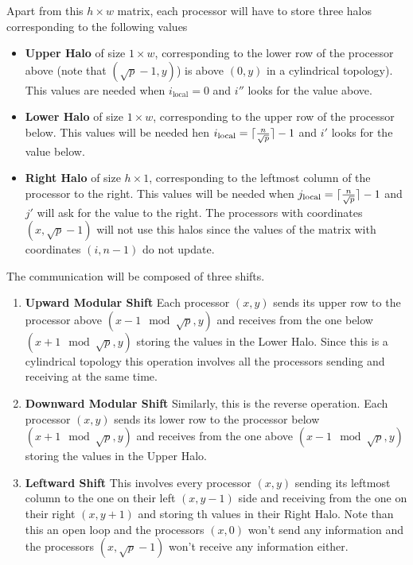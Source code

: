 \documentclass[a4paper]{article}
\begin{document}
    Apart from this $h \times w$ matrix, each processor will have to store three halos corresponding to the following values
    \begin{itemize}
        \item \textbf{Upper Halo} of size $1 \times w$, corresponding to the lower row of the processor above (note that $(\sqrt{p}-1,y)$) is above $(0,y)$ in a cylindrical topology). This values are needed when $i_{\text{local}} = 0$ and $i''$ looks for the value above.
        \item \textbf{Lower Halo} of size $1 \times w$, corresponding to the upper row of the processor below. This values will be needed hen $i_{\text{local}} = \lceil\frac{n}{\sqrt{p}}\rceil -1$ and $i'$ looks for the value below.
        \item \textbf{Right Halo} of size $h \times 1$, corresponding to the leftmost column of the processor to the right. This values will be needed when $j_{\text{local}} = \lceil\frac{n}{\sqrt{p}}\rceil -1$ and $j'$ will ask for the value to the right. The processors with coordinates $(x, \sqrt{p}-1)$ will not use this halos since the values of the matrix with coordinates $(i,n-1)$ do not update.
    \end{itemize}
    The communication will be composed of three shifts.
    \begin{enumerate}
        \item \textbf{Upward Modular Shift} Each processor $(x,y)$ sends its upper row to the processor above $(x -1 \mod \sqrt{p},y)$ and receives from the one below $(x +1 \mod \sqrt{p},y)$ storing the values in the Lower Halo. Since this is a cylindrical topology this operation involves all the processors sending and receiving at the same time.
        \item \textbf{Downward Modular Shift} Similarly, this is the reverse operation. Each processor $(x,y)$ sends its lower row to the processor below $(x +1 \mod \sqrt{p},y)$ and receives from the one above $(x -1 \mod \sqrt{p},y)$ storing the values in the Upper Halo.
        \item \textbf{Leftward Shift} This involves every processor $(x,y)$ sending its leftmost column to the one on their left $(x,y-1)$ side and receiving from the one on their right $(x,y+1)$ and storing th values in their Right Halo. Note than this an open loop and the processors $(x,0)$ won't send any information and the processors $(x,\sqrt{p}-1)$ won't receive any information either.
    \end{enumerate}
\end{document}
